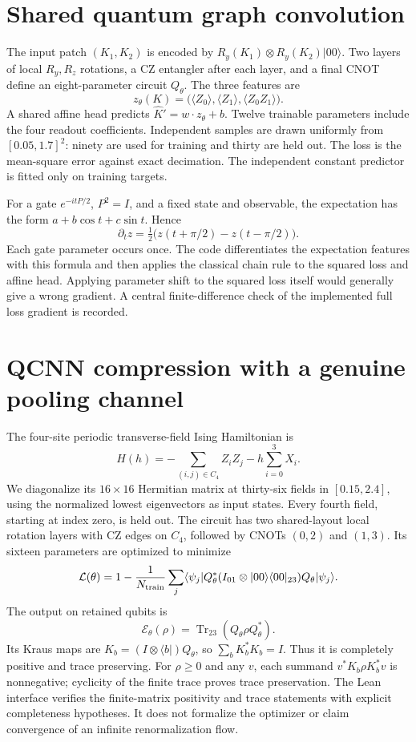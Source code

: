\documentclass[11pt,oneside,openany]{book}
\theoremstyle{definition}\newtheorem{definition}[theorem]{Definition}
\theoremstyle{remark}\newtheorem{remark}[theorem]{Remark}
\begin{document}
\section{Shared quantum graph convolution}
The input patch $(K_1,K_2)$ is encoded by
$R_y(K_1)\otimes R_y(K_2)|00\rangle$. Two layers of local $R_y,R_z$ rotations, a CZ entangler after each layer, and a final CNOT define an eight-parameter circuit $Q_\theta$. The three features are
\[
 z_\theta(K)=\bigl(\langle Z_0\rangle,\langle Z_1\rangle,\langle Z_0Z_1\rangle\bigr).
\]
A shared affine head predicts $\widehat K'=w\cdot z_\theta+b$. Twelve trainable parameters include the four readout coefficients. Independent samples are drawn uniformly from $[0.05,1.7]^2$: ninety are used for training and thirty are held out. The loss is the mean-square error against exact decimation. The independent constant predictor is fitted only on training targets.

For a gate $e^{-itP/2}$, $P^2=I$, and a fixed state and observable, the expectation has the form $a+b\cos t+c\sin t$. Hence
\[
 \partial_t z=\tfrac12\bigl(z(t+\pi/2)-z(t-\pi/2)\bigr).
\]
Each gate parameter occurs once. The code differentiates the expectation features with this formula and then applies the classical chain rule to the squared loss and affine head. Applying parameter shift to the squared loss itself would generally give a wrong gradient. A central finite-difference check of the implemented full loss gradient is recorded.

\section{QCNN compression with a genuine pooling channel}
The four-site periodic transverse-field Ising Hamiltonian is
\[
 H(h)=-\sum_{(i,j)\in C_4}Z_iZ_j-h\sum_{i=0}^3X_i.
\]
We diagonalize its $16\times16$ Hermitian matrix at thirty-six fields in $[0.15,2.4]$, using the normalized lowest eigenvectors as input states. Every fourth field, starting at index zero, is held out. The circuit has two shared-layout local rotation layers with CZ edges on $C_4$, followed by CNOTs $(0,2)$ and $(1,3)$. Its sixteen parameters are optimized to minimize
\[
 \mathcal L(\theta)=1-\frac1{N_{\rm train}}\sum_j
 \langle\psi_j|Q_\theta^*(I_{01}\otimes|00\rangle\langle00|_{23})Q_\theta|\psi_j\rangle.
\]
The output on retained qubits is
\[
 \mathcal E_\theta(\rho)=\operatorname{Tr}_{23}(Q_\theta\rho Q_\theta^*).
\]
Its Kraus maps are $K_b=(I\otimes\langle b|)Q_\theta$, so
$\sum_bK_b^*K_b=I$. Thus it is completely positive and trace preserving. For $\rho\ge0$ and any $v$, each summand $v^*K_b\rho K_b^*v$ is nonnegative; cyclicity of the finite trace proves trace preservation. The Lean interface verifies the finite-matrix positivity and trace statements with explicit completeness hypotheses. It does not formalize the optimizer or claim convergence of an infinite renormalization flow.
\end{document}
